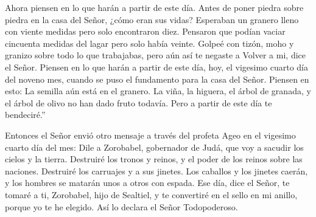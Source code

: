  Ahora piensen en lo que harán a partir de este día. Antes
de poner piedra sobre piedra en la casa del Señor,  ¿cómo
eran sus vidas? Esperaban un granero lleno con viente medidas pero solo
encontraron diez. Pensaron que podían vaciar cincuenta medidas del lagar
pero solo había veinte.  Golpeé con tizón, moho y granizo
sobre todo lo que trabajabas, pero aún así te negaste a Volver a mi,
dice el Señor.  Piensen en lo que harán a partir de este
día, hoy, el vigesimo cuarto día del noveno mes, cuando se puso el
fundamento para la casa del Señor. Piensen en esto:  La
semilla aún está en el granero. La viña, la higuera, el árbol de
granada, y el árbol de olivo no han dado fruto todavía. Pero a partir de
este día te bendeciré.''

 Entonces el Señor envió otro mensaje a través del profeta
Ageo en el vigesimo cuarto día del mes:  Dile a Zorobabel,
gobernador de Judá, que voy a sacudir los cielos y la tierra.
 Destruiré los tronos y reinos, y el poder de los reinos
sobre las naciones. Destruiré los carruajes y a sus jinetes. Los
caballos y los jinetes caerán, y los hombres se matarán unos a otros con
espada.  Ese día, dice el Señor, te tomaré a ti, Zorobabel,
hijo de Sealtiel, y te convertiré en el sello en mi anillo, porque yo te
he elegido. Así lo declara el Señor Todopoderoso.
